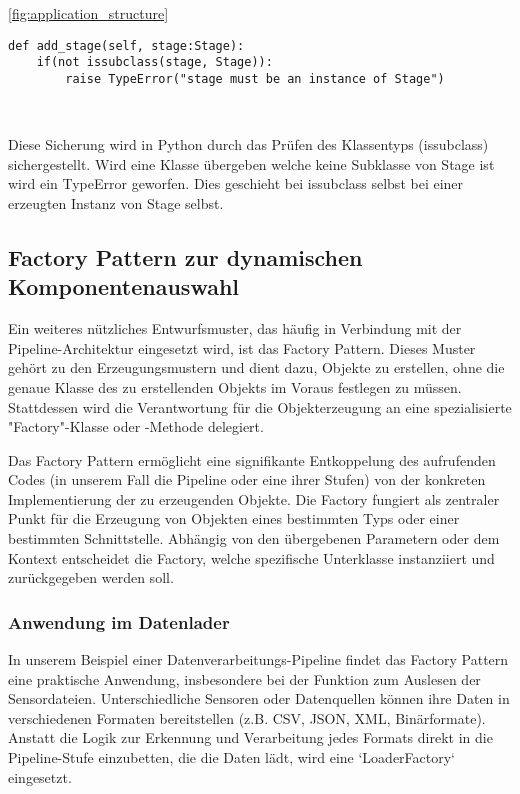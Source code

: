 \documentclass[a4paper]{article} %
\begin{document}
\ref{fig:application_structure}

\begin{verbatim}
def add_stage(self, stage:Stage):
    if(not issubclass(stage, Stage)):
        raise TypeError("stage must be an instance of Stage")
\end{verbatim}\

Diese Sicherung wird in Python durch das Prüfen des Klassentyps (issubclass) sichergestellt. Wird eine Klasse übergeben welche keine Subklasse von Stage ist wird ein TypeError geworfen. Dies geschieht bei issubclass selbst bei einer erzeugten Instanz von Stage selbst.

\subsection{Factory Pattern zur dynamischen Komponentenauswahl}
Ein weiteres nützliches Entwurfsmuster, das häufig in Verbindung mit der Pipeline-Architektur eingesetzt wird, ist das Factory Pattern. Dieses Muster gehört zu den Erzeugungsmustern und dient dazu, Objekte zu erstellen, ohne die genaue Klasse des zu erstellenden Objekts im Voraus festlegen zu müssen. Stattdessen wird die Verantwortung für die Objekterzeugung an eine spezialisierte "Factory"-Klasse oder -Methode delegiert.

Das Factory Pattern ermöglicht eine signifikante Entkoppelung des aufrufenden Codes (in unserem Fall die Pipeline oder eine ihrer Stufen) von der konkreten Implementierung der zu erzeugenden Objekte. Die Factory fungiert als zentraler Punkt für die Erzeugung von Objekten eines bestimmten Typs oder einer bestimmten Schnittstelle. Abhängig von den übergebenen Parametern oder dem Kontext entscheidet die Factory, welche spezifische Unterklasse instanziiert und zurückgegeben werden soll.

\subsubsection{Anwendung im Datenlader}
In unserem Beispiel einer Datenverarbeitungs-Pipeline findet das Factory Pattern eine praktische Anwendung, insbesondere bei der Funktion zum Auslesen der Sensordateien. Unterschiedliche Sensoren oder Datenquellen können ihre Daten in verschiedenen Formaten bereitstellen (z.B. CSV, JSON, XML, Binärformate). Anstatt die Logik zur Erkennung und Verarbeitung jedes Formats direkt in die Pipeline-Stufe einzubetten, die die Daten lädt, wird eine `LoaderFactory` eingesetzt.
\end{document}
